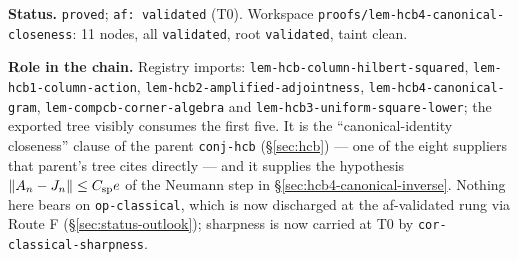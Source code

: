 \medskip
\noindent\textbf{Status.} \texttt{proved}; \texttt{af: validated} (T0). Workspace
\texttt{proofs/lem-hcb4-canonical-closeness}: 11 nodes, all \texttt{validated}, root
\texttt{validated}, taint clean.

\noindent\textbf{Role in the chain.} Registry imports:
\texttt{lem-hcb-column-hilbert-squared},
\texttt{lem-hcb1-column-action},
\texttt{lem-hcb2-amplified-adjointness},
\texttt{lem-hcb4-canonical-gram},
\texttt{lem-compcb-corner-algebra} and
\texttt{lem-hcb3-uniform-square-lower}; the exported tree visibly consumes the first five.
It is the ``canonical-identity closeness'' clause of the parent \texttt{conj-hcb}
(\S\ref{sec:hcb}) --- one of the eight suppliers that parent's tree cites directly --- and
it supplies the hypothesis $\lVert A_n-J_n\rVert\le C_{\mathrm{sp}}e$ of the Neumann
step in \S\ref{sec:hcb4-canonical-inverse}. Nothing here bears on \texttt{op-classical}, which is now discharged at the af-validated rung via Route F (\S\ref{sec:status-outlook}); sharpness is now carried at T0 by \texttt{cor-classical-sharpness}.
